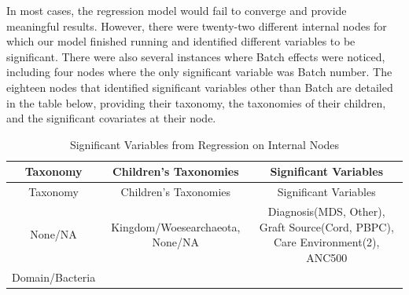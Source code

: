 \documentclass[12pt,twoside]{dukestatscithesis}
\begin{document}
In most cases, the regression model would fail to converge and provide
meaningful results. However, there were twenty-two different internal
nodes for which our model finished running and identified different
variables to be significant. There were also several instances where
Batch effects were noticed, including four nodes where the only
significant variable was Batch number. The eighteen nodes that
identified significant variables other than Batch are detailed in the
table below, providing their taxonomy, the taxonomies of their children,
and the significant covariates at their node.
\begin{longtable}[]{@{}ccc@{}}
\caption{Significant Variables from Regression on Internal
Nodes}\tabularnewline
\toprule
\begin{minipage}[b]{0.23\columnwidth}\centering\strut
Taxonomy\strut
\end{minipage} & \begin{minipage}[b]{0.46\columnwidth}\centering\strut
Children's Taxonomies\strut
\end{minipage} & \begin{minipage}[b]{0.22\columnwidth}\centering\strut
Significant Variables\strut
\end{minipage}\tabularnewline
\midrule
\endfirsthead
\toprule
\begin{minipage}[b]{0.23\columnwidth}\centering\strut
Taxonomy\strut
\end{minipage} & \begin{minipage}[b]{0.46\columnwidth}\centering\strut
Children's Taxonomies\strut
\end{minipage} & \begin{minipage}[b]{0.22\columnwidth}\centering\strut
Significant Variables\strut
\end{minipage}\tabularnewline
\midrule
\endhead
\begin{minipage}[t]{0.23\columnwidth}\centering\strut
None/NA\strut
\end{minipage} & \begin{minipage}[t]{0.46\columnwidth}\centering\strut
Kingdom/Woesearchaeota, None/NA\strut
\end{minipage} & \begin{minipage}[t]{0.22\columnwidth}\centering\strut
Diagnosis(MDS, Other), Graft Source(Cord, PBPC), Care Environment(2),
ANC500\strut
\end{minipage}\tabularnewline
\begin{minipage}[t]{0.23\columnwidth}\centering\strut
Domain/Bacteria\strut
\end{minipage} & \begin{minipage}[t]{0.46\columnwidth}\centering\strut

\end{minipage}
\end{longtable}
\end{document}
